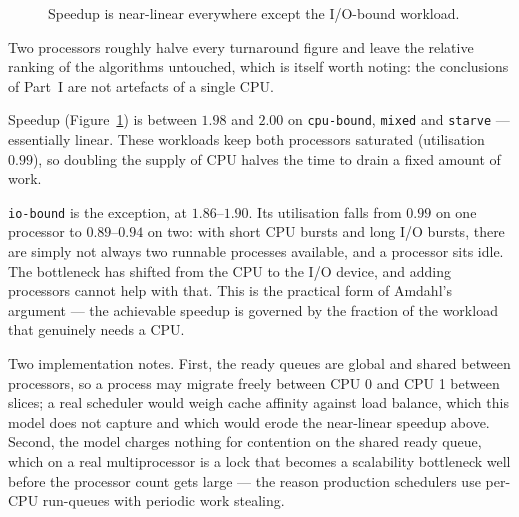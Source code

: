\documentclass[11pt,a4paper]{article}
\begin{document}
\begin{figure}[h]
\centering
{}
\caption{Speedup is near-linear everywhere except the I/O-bound workload.}
\label{fig:speedup}
\end{figure}

Two processors roughly halve every turnaround figure and leave the relative
ranking of the algorithms untouched, which is itself worth noting: the
conclusions of Part~I are not artefacts of a single CPU.

Speedup (Figure~\ref{fig:speedup}) is between $1.98$ and $2.00$ on
\texttt{cpu-bound}, \texttt{mixed} and \texttt{starve} --- essentially linear.
These workloads keep both processors saturated (utilisation $0.99$), so
doubling the supply of CPU halves the time to drain a fixed amount of work.

\texttt{io-bound} is the exception, at $1.86$--$1.90$. Its utilisation falls
from $0.99$ on one processor to $0.89$--$0.94$ on two: with short CPU bursts
and long I/O bursts, there are simply not always two runnable processes
available, and a processor sits idle. The bottleneck has shifted from the CPU
to the I/O device, and adding processors cannot help with that. This is the
practical form of Amdahl's argument --- the achievable speedup is governed by
the fraction of the workload that genuinely needs a CPU.

Two implementation notes. First, the ready queues are global and shared between
processors, so a process may migrate freely between CPU 0 and CPU 1 between
slices; a real scheduler would weigh cache affinity against load balance, which
this model does not capture and which would erode the near-linear speedup
above. Second, the model charges nothing for contention on the shared ready
queue, which on a real multiprocessor is a lock that becomes a scalability
bottleneck well before the processor count gets large --- the reason production
schedulers use per-CPU run-queues with periodic work stealing.
\end{document}
